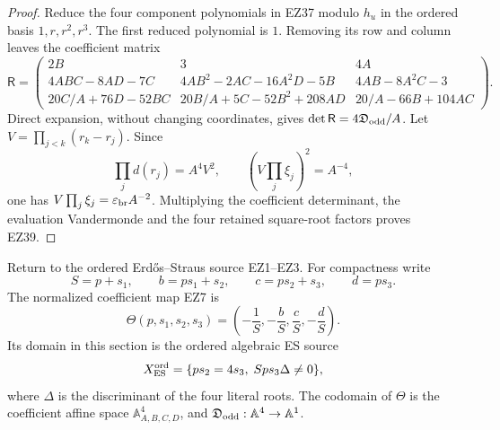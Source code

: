 \begin{proof}
Reduce the four component polynomials in EZ37 modulo \(h_u\) in the ordered
basis \(1,r,r^2,r^3\).  The first reduced polynomial is \(1\).  Removing its
row and column leaves the coefficient matrix
\[
\mathsf R=
\begin{pmatrix}
2B&3&4A\\
4ABC-8AD-7C&4AB^2-2AC-16A^2D-5B&4AB-8A^2C-3\\
20C/A+76D-52BC&20B/A+5C-52B^2+208AD&20/A-66B+104AC
\end{pmatrix}.
\]
Direct expansion, without changing coordinates, gives
\(\det\mathsf R=4\mathfrak D_{\rm odd}/A\).  Let
\(V=\prod_{j<k}(r_k-r_j)\).  Since
\[
 \prod_jd(r_j)=A^4V^2,
 \qquad
 \left(V\prod_j\xi_j\right)^2=A^{-4},
\]
one has \(V\prod_j\xi_j=\varepsilon_{\rm br}A^{-2}\).  Multiplying the
coefficient determinant, the evaluation Vandermonde and the four retained
square-root factors proves EZ39.
\end{proof}

Return to the ordered Erd\H{o}s--Straus source EZ1--EZ3.  For compactness write
\begin{equation}
 S=p+s_1,\qquad b=ps_1+s_2,\qquad c=ps_2+s_3,\qquad d=ps_3.       \tag{EZ40}
\end{equation}
The normalized coefficient map EZ7 is
\begin{equation}
 \Theta(p,s_1,s_2,s_3)
 =\left(-\frac1S,-\frac bS,\frac cS,-\frac dS\right).           \tag{EZ41}
\end{equation}
Its domain in this section is the ordered algebraic ES source
\[
 X_{\rm ES}^{\rm ord}
 =\{ps_2=4s_3,\;Sps_3\Delta\ne0\},
\]
where \(\Delta\) is the discriminant of the four literal roots.  The codomain
of \(\Theta\) is the coefficient affine space \(\mathbb A^4_{A,B,C,D}\), and
\(\mathfrak D_{\rm odd}:\mathbb A^4\to\mathbb A^1\).

